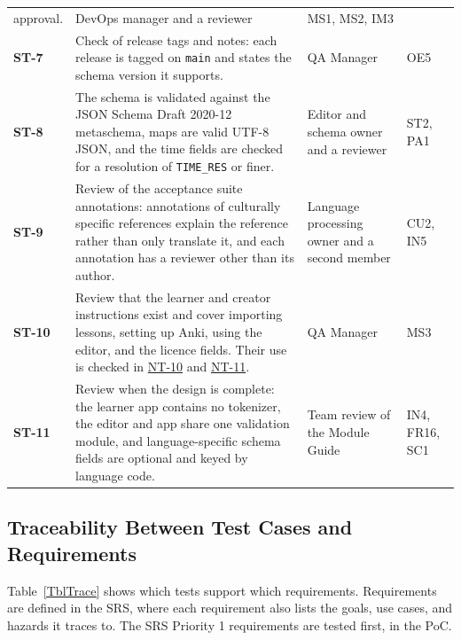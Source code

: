 \documentclass[12pt, titlepage]{article}
\newcommand{\tid}[1]{\hypertarget{test:#1}{\textbf{#1}}}
\newcommand{\tref}[1]{\hyperlink{test:#1}{#1}}
\newcommand{\cn}[1]{\texttt{#1}}
\begin{document}
\begin{longtable}{@{}P{0.08\textwidth}P{0.34\textwidth}P{0.2\textwidth}P{0.3\textwidth}@{}}
approval. & DevOps manager and a reviewer & MS1, MS2, IM3\\
\tid{ST-7} & Check of release tags and notes: each release is tagged on
\texttt{main} and states the schema version it supports. & QA Manager & OE5\\
\tid{ST-8} & The schema is validated against the JSON Schema Draft 2020-12
metaschema, maps are valid UTF-8 JSON, and the time fields are checked for a
resolution of \cn{TIME\_RES} or finer. & Editor and schema owner and a
reviewer & ST2, PA1\\
\tid{ST-9} & Review of the acceptance suite annotations: annotations of
culturally specific references explain the reference rather than only translate
it, and each annotation has a reviewer other than its author. & Language
processing owner and a second member & CU2, IN5\\
\tid{ST-10} & Review that the learner and creator instructions exist and cover
importing lessons, setting up Anki, using the editor, and the licence fields.
Their use is checked in \tref{NT-10} and \tref{NT-11}. & QA Manager & MS3\\
\tid{ST-11} & Review when the design is complete: the learner app contains no
tokenizer, the editor and app share one validation module, and language-specific
schema fields are optional and keyed by language code. & Team review of the
Module Guide & IN4, FR16, SC1\\
\bottomrule
\end{longtable}

\subsection{Traceability Between Test Cases and Requirements} \label{SecTrace}

Table~\ref{TblTrace} shows which tests support which requirements. Requirements
are defined in the SRS, where each requirement also lists the goals, use cases,
and hazards it traces to. The SRS Priority 1 requirements are tested first, in
the PoC.
\end{document}
